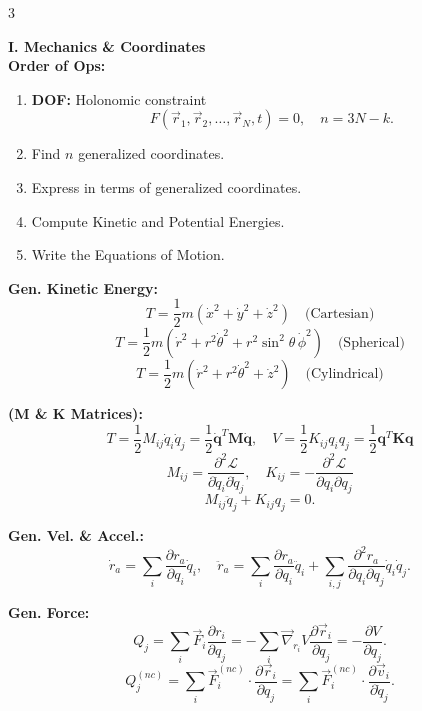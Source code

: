 \documentclass[1pt]{article}
\begin{document}
\begin{multicols}{3} %
\raggedcolumns
\setlength{\columnseprule}{0.1pt}
\scriptsize%
\noindent %
\abovedisplayskip=2pt
\belowdisplayskip=2pt


\textbf{I. Mechanics \& Coordinates}\\[2pt]
\textbf{Order of Ops:} 
\begin{enumerate}[noitemsep, topsep=0pt]
    \item \textbf{DOF:} Holonomic constraint 
    \[
    F(\vec{r}_1, \vec{r}_2, \ldots, \vec{r}_N, t)=0,
    \quad n=3N-k.
    \]
    \item Find \(n\) generalized coordinates.
    \item Express in terms of generalized coordinates.
    \item Compute Kinetic and Potential Energies.
    \item Write the Equations of Motion.
\end{enumerate}

\textbf{Gen. Kinetic Energy:}  
\[
T = \frac{1}{2} m (\dot{x}^2+\dot{y}^2+\dot{z}^2) \quad \text{(Cartesian)}
\]
\[
T = \frac{1}{2} m (\dot{r}^2+r^2\dot{\theta}^2+r^2\sin^2\theta\,\dot{\phi}^2) \quad \text{(Spherical)}
\]
\[
T = \frac{1}{2} m (\dot{r}^2+r^2\dot{\theta}^2+\dot{z}^2) \quad \text{(Cylindrical)}
\]

\textbf{(M \& K Matrices):} 
\[
T=\frac{1}{2}M_{ij}\dot{q}_i\dot{q}_j=\frac{1}{2}\dot{\mathbf{q}}^T\mathbf{M}\dot{\mathbf{q}},\quad
V=\frac{1}{2}K_{ij}q_iq_j=\frac{1}{2}\mathbf{q}^T\mathbf{K}\mathbf{q}
\]
\[
M_{ij}=\frac{\partial^2\mathcal{L}}{\partial\dot{q}_i\partial\dot{q}_j},\quad
K_{ij}=-\frac{\partial^2\mathcal{L}}{\partial q_i\partial q_j}
\]
\[
M_{ij}\ddot{q}_j+K_{ij}q_j=0.
\]

\textbf{Gen. Vel. \& Accel.:} 
\[
\dot{r}_a=\sum_i\frac{\partial r_a}{\partial q_i}\dot{q}_i,\quad
\ddot{r}_a=\sum_i\frac{\partial r_a}{\partial q_i}\ddot{q}_i+\sum_{i,j}\frac{\partial^2r_a}{\partial q_i\partial q_j}\dot{q}_i\dot{q}_j.
\]

\textbf{Gen. Force:} 
\[
Q_j=\sum_i\vec{F}_i\frac{\partial r_i}{\partial q_j}
=-\sum_i\vec{\nabla}_{r_i}V\frac{\partial \vec{r}_i}{\partial q_j}
=-\frac{\partial V}{\partial q_j}.
\]
\[
Q_j^{(nc)}=\sum_i\vec{F}_i^{(nc)}\cdot\frac{\partial \vec{r}_i}{\partial q_j}
=\sum_i\vec{F}_i^{(nc)}\cdot\frac{\partial \vec{v}_i}{\partial \dot{q}_j}.
\]


\end{multicols}
\end{document}

